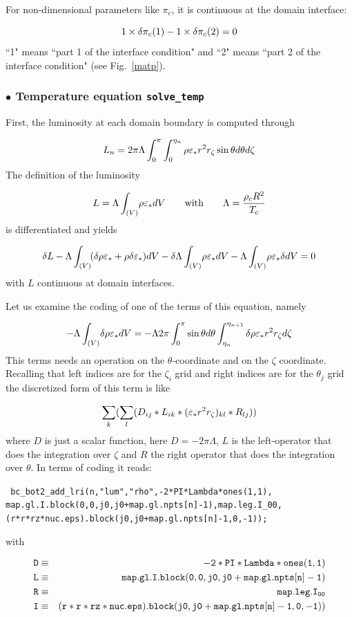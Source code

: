 For non-dimensional parameters like $\pi_c$, it is continuous at the domain
interface:

\[ 1\times\delta\pi_c({\rm 1}) -1\times\delta\pi_c({\rm 2}) = 0\]
``1" means ``part 1 of the interface condition" and ``2" means ``part 2
of the interface condition" (see Fig.~\ref{matp}).


\subsubsection{$\bullet$ \bf Temperature equation {\tt solve\_temp}}

First, the luminosity at each domain boundary is computed through

\[ L_n = 2\pi\Lambda\int_0^\pi\int_0^{\eta_n} \rho\varepsilon_* r^2r_\zeta\sin\theta
d\theta d\zeta\]
The definition of the luminosity 

\[ L=\Lambda\int_{(V)}\! \rho\varepsilon_* dV {\qquad {\rm with}\qquad} \Lambda = \frac{\rho_cR^2}{T_c}\]
is differentiated and yields

\[ \delta L - \Lambda\int_{(V)}\! (\delta\rho\varepsilon_* +\rho\delta\varepsilon_*)dV -
\delta\Lambda\int_{(V)}\! \rho\varepsilon_* dV - \Lambda\int_{(V)}\! \rho\varepsilon_* \delta dV
= 0\]
with $L$ continuous at domain interfaces.

Let us examine the coding of one of the terms of this equation, namely

\[ - \Lambda\int_{(V)}\!\delta\rho\varepsilon_* dV = -\Lambda 2\pi\int_0^\pi\sin\theta d\theta
\int_{\eta_n}^{\eta_{n+1}} \delta\rho\varepsilon_*r^2r_\zeta d\zeta\]
This terms needs an operation on the $\theta$-coordinate and on the
$\zeta$ coordinate. Recalling that left indices are for the $\zeta_i$
grid and right indices are for the $\theta_j$ grid the discretized form of
this  term is like

\[\sum_k ( \sum_l  ( D_{ij} * L_{ik} * (\varepsilon_*r^2r_\zeta)_{kl} * R_{lj}  ))  \]
where $D$ is just a scalar function, here $D=-2\pi\Lambda$, $L$ is the
left-operator that does the integration over $\zeta$ and $R$ the right
operator that does the integration over $\theta$. In terms of coding it
reads:

\begin{center}
{\tt
bc\_bot2\_add\_lri(n,"lum","rho",-2*PI*Lambda*ones(1,1),\\
map.gl.I.block(0,0,j0,j0+map.gl.npts[n]-1),map.leg.I\_00,\\
(r*r*rz*nuc.eps).block(j0,j0+map.gl.npts[n]-1,0,-1)); }
\end{center}

with

\begin{eqnarray}
\tt D &\equiv&\tt -2*PI*Lambda*ones(1,1)\nonumber\\
\tt L &\equiv&\tt map.gl.I.block(0,0,j0,j0+map.gl.npts[n]-1)\nonumber\\
\tt R &\equiv&\tt map.leg.I_{00}\nonumber\\
\tt I &\equiv&\tt
(r*r*rz*nuc.eps).block(j0,j0+map.gl.npts[n]-1,0,-1))\label{insexamp}
\end{eqnarray}


